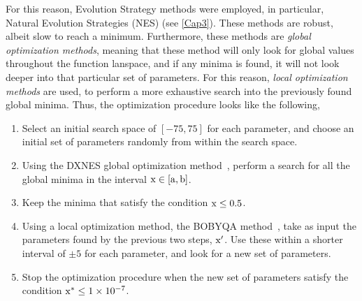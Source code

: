 For this reason, Evolution Strategy methods were employed, in particular, Natural Evolution 
Strategies (NES) (see \autoref{Cap3}). These methods are robust, albeit slow to reach a 
minimum. 
Furthermore, these methods are \emph{global optimization methods}, meaning that these 
method will only look for global values throughout the function lanspace, and if any minima 
is found, it will not look deeper into that particular set of parameters. For this reason,
\emph{local optimization methods} are used, to perform a more exhaustive search into the 
previously found global minima. Thus, the optimization procedure looks like the following,
\begin{enumerate}
    \item Select an initial search space of \(\left[-75, 75\right]\) for each parameter, and choose an initial set of parameters randomly from within the search space.
    \item Using the DXNES global optimization method~\cite{nomuraDistanceweightedExponentialNatural2021}, perform a search for all the global minima in the interval \(\rm{x} \in \left[a, b\right]\).
    \item Keep the minima that satisfy the condition \(\rm{x} \leq 0.5\).
    \item Using a local optimization method, the BOBYQA method~\cite{powellUOBYQAUnconstrainedOptimization2002}, take as input the parameters found by the previous two steps, \(\rm{x}^{\prime}\). Use these within a shorter interval of \(\pm 5\) for each parameter, and look for a new set of parameters.
    \item Stop the optimization procedure when the new set of parameters satisfy the condition \(\rm{x}^{*} \leq \num{1e-7}\).
\end{enumerate}

